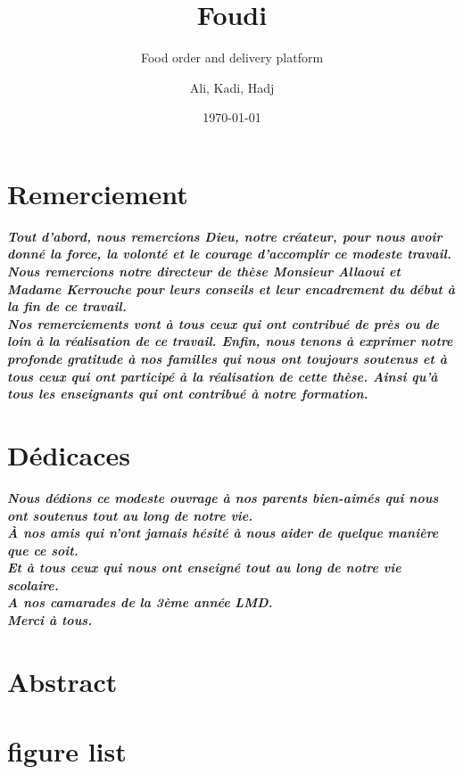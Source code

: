 \documentclass[a4paper]{report}
\title{\textbf{Foudi}}
\subtitle{Food order and delivery platform}
\author{Ali, Kadi, Hadj}
\date{\today}
\begin{document}
\maketitle

\chapter*{Remerciement}
\begin{center}
\Large \textbf{\textit{Tout d'abord, nous remercions Dieu, notre créateur, pour nous avoir donné la force, la volonté et le courage d'accomplir ce modeste travail.\\
Nous remercions notre directeur de thèse Monsieur Allaoui et Madame Kerrouche pour leurs conseils et leur encadrement du début à la fin de ce travail.\\
Nos remerciements vont à tous ceux qui ont contribué de près ou de loin à la réalisation de ce travail. Enfin, nous tenons à exprimer notre profonde gratitude à nos familles qui nous ont toujours soutenus et à tous ceux qui ont participé à la réalisation de cette thèse. Ainsi qu'à tous les enseignants qui ont contribué à notre formation.}}
\end{center}

\chapter*{Dédicaces}
\begin{center}
\Large \textbf{\textit{Nous dédions ce modeste ouvrage à nos parents bien-aimés qui nous ont soutenus tout au long de notre vie.\\
À nos amis qui n'ont jamais hésité à nous aider de quelque manière que ce soit.\\
Et à tous ceux qui nous ont enseigné tout au long de notre vie scolaire.\\
A nos camarades de la 3ème année LMD.\\
Merci à tous.}}
\end{center}

\newpage
\chapter*{Abstract}


\tableofcontents

\newpage
\chapter*{figure list}
\end{document}
